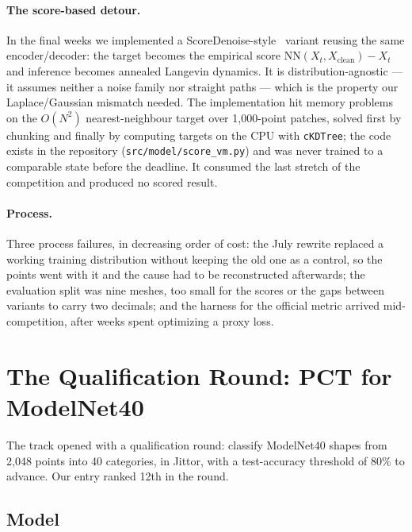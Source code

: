 \documentclass{article}
\begin{document}
\paragraph{The score-based detour.} In the final weeks we implemented a ScoreDenoise-style~\citep{scoredenoise} variant reusing the same encoder/decoder: the target becomes the empirical score $\mathrm{NN}(X_t, X_{\text{clean}}) - X_t$ and inference becomes annealed Langevin dynamics. It is distribution-agnostic --- it assumes neither a noise family nor straight paths --- which is the property our Laplace/Gaussian mismatch needed. The implementation hit memory problems on the $O(N^2)$ nearest-neighbour target over 1{,}000-point patches, solved first by chunking and finally by computing targets on the CPU with \texttt{cKDTree}; the code exists in the repository (\texttt{src/model/score\_vm.py}) and was never trained to a comparable state before the deadline. It consumed the last stretch of the competition and produced no scored result.

\paragraph{Process.} Three process failures, in decreasing order of cost: the July rewrite replaced a working training distribution without keeping the old one as a control, so the points went with it and the cause had to be reconstructed afterwards; the evaluation split was nine meshes, too small for the scores or the gaps between variants to carry two decimals; and the harness for the official metric arrived mid-competition, after weeks spent optimizing a proxy loss.

\section{The Qualification Round: PCT for ModelNet40}
\label{sec:warmup}

The track opened with a qualification round: classify ModelNet40 shapes from 2{,}048 points into 40 categories, in Jittor, with a test-accuracy threshold of 80\% to advance. Our entry ranked 12th in the round.

\subsection{Model}
\end{document}
